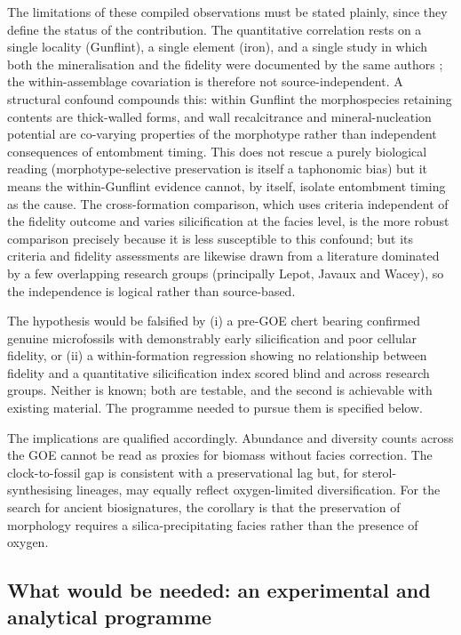 \documentclass[11pt]{article}
\begin{document}
The limitations of these compiled observations must be stated plainly, since they define the status of the
contribution. The quantitative correlation rests on a single locality (Gunflint), a single element
(iron), and a single study in which both the mineralisation and the fidelity were documented by the
same authors \citep{Lepot2017a}; the within-assemblage covariation is therefore not
source-independent. A structural confound compounds this: within Gunflint the morphospecies retaining
contents are thick-walled forms, and wall recalcitrance and mineral-nucleation potential are
co-varying properties of the morphotype rather than independent consequences of entombment timing.
This does not rescue a purely biological reading (morphotype-selective preservation is itself a
taphonomic bias) but it means the within-Gunflint evidence cannot, by itself, isolate entombment
timing as the cause. The cross-formation comparison, which uses criteria independent of the fidelity
outcome and varies silicification at the facies level, is the more robust comparison precisely because it
is less susceptible to this confound; but its criteria and fidelity assessments are likewise drawn
from a literature dominated by a few overlapping research groups (principally Lepot, Javaux and
Wacey), so the independence is logical rather than source-based.

The hypothesis would be falsified by (i) a pre-GOE chert bearing confirmed genuine microfossils with
demonstrably early silicification and poor cellular fidelity, or (ii) a within-formation regression
showing no relationship between fidelity and a quantitative silicification index scored blind and
across research groups. Neither is known; both are testable, and the second is achievable with
existing material. The programme needed to pursue them is specified below.

The implications are qualified accordingly. Abundance and diversity counts across the GOE cannot be
read as proxies for biomass without facies correction. The clock-to-fossil gap is consistent with a
preservational lag but, for sterol-synthesising lineages, may equally reflect oxygen-limited
diversification. For the search for ancient biosignatures, the corollary is that the preservation of
morphology requires a silica-precipitating facies rather than the presence of oxygen.

\subsection{What would be needed: an experimental and analytical programme}
\end{document}
